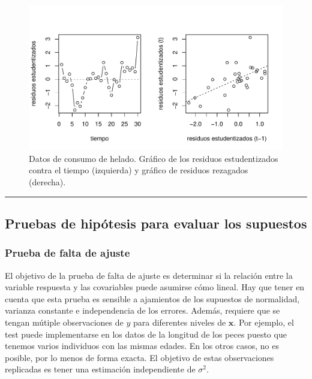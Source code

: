 \documentclass[
]{article}
\begin{document}
\begin{figure}

{\centering \includegraphics{MLGI_files/figure-latex/heladosResiduos2-1} 

}

\caption{Datos de consumo de helado. Gráfico de los residuos estudentizados contra el tiempo (izquierda) y gráfico de residuos rezagados (derecha).}\label{fig:heladosResiduos2}
\end{figure}
\rule{\textwidth}{0.4pt}

\hypertarget{pruebas-de-hipuxf3tesis-para-evaluar-los-supuestos}{%
\subsection{Pruebas de hipótesis para evaluar los supuestos}\label{pruebas-de-hipuxf3tesis-para-evaluar-los-supuestos}}

\hypertarget{prueba-de-falta-de-ajuste}{%
\subsubsection{Prueba de falta de ajuste}\label{prueba-de-falta-de-ajuste}}

El objetivo de la prueba de falta de ajuste es determinar si la relación entre la variable respuesta y las covariables puede asumirse cómo lineal. Hay que tener en cuenta que esta prueba es sensible a ajamientos de los supuestos de normalidad, varianza constante e independencia de los errores. Además, requiere que se tengan mútiple observaciones de \(y\) para diferentes niveles de \(\boldsymbol x\). Por ejemplo, el test puede implementarse en los datos de la longitud de los peces puesto que tenemos varios individuos con las mismas edades. En los otros casos, no es posible, por lo menos de forma exacta. El objetivo de estas observaciones replicadas es tener una estimación independiente de \(\sigma^{2}\).
\end{document}
